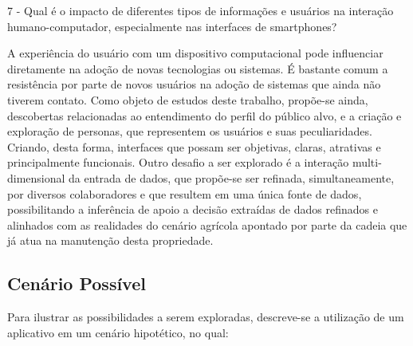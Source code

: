\documentclass[12pt]{article}
\begin{document}
7 - Qual é o impacto de diferentes tipos de informações e usuários na interação humano-computador, especialmente nas interfaces de smartphones?

A experiência do usuário com um dispositivo computacional pode influenciar diretamente na adoção de novas tecnologias ou sistemas. É bastante comum a resistência por parte de novos usuários na adoção de sistemas que ainda não tiverem contato. Como objeto de estudos deste trabalho, propõe-se ainda, descobertas relacionadas ao entendimento do perfil do público alvo, e a criação e exploração de personas, que representem os usuários e suas peculiaridades. Criando, desta forma, interfaces que possam ser objetivas, claras, atrativas e principalmente funcionais. Outro desafio a ser explorado é a interação multi-dimensional da entrada de dados, que propõe-se ser refinada, simultaneamente, por diversos colaboradores e que resultem em uma única fonte de dados, possibilitando a inferência de apoio a decisão extraídas de dados refinados e alinhados com as realidades do cenário agrícola apontado por parte da cadeia que já atua na manutenção desta propriedade.

\subsection{Cenário Possível}
\label{sec:cenario_possivel}

Para ilustrar as possibilidades a serem exploradas, descreve-se a utilização de um aplicativo em um cenário hipotético, no qual:
\end{document}
